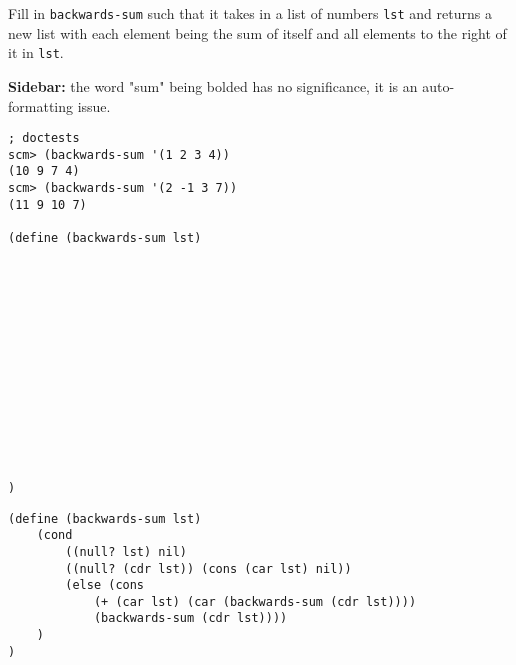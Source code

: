 \begin{blocksection}
\question
Fill in \lstinline{backwards-sum} such that it takes in a list of numbers \lstinline{lst} and returns a new list with each element being the sum of itself and all elements to the right of it in \lstinline{lst}. 

\textbf{Sidebar:} the word "sum" being bolded has no significance, it is an auto-formatting issue.

\begin{lstlisting}
; doctests
scm> (backwards-sum '(1 2 3 4))
(10 9 7 4)
scm> (backwards-sum '(2 -1 3 7))
(11 9 10 7)

(define (backwards-sum lst)














)
\end{lstlisting}
\end{blocksection}

\begin{blocksection}
\begin{solution}
\begin{lstlisting}
(define (backwards-sum lst)
    (cond 
        ((null? lst) nil)
        ((null? (cdr lst)) (cons (car lst) nil))
        (else (cons
            (+ (car lst) (car (backwards-sum (cdr lst))))
            (backwards-sum (cdr lst))))
    )   
)
\end{lstlisting}
\end{solution}
\end{blocksection}